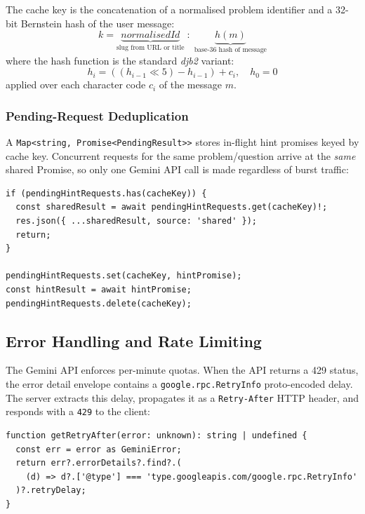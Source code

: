 \documentclass[11pt,a4paper]{article}
\begin{document}
The cache key is the concatenation of a normalised problem identifier and a
32-bit Bernstein hash of the user message:
\[
  k = \underbrace{\mathit{normalisedId}}_{\text{slug from URL or title}}
      \;:\;
      \underbrace{h(m)}_{\text{base-36 hash of message}}
\]
where the hash function is the standard \emph{djb2} variant:
\[
  h_i = ((h_{i-1} \ll 5) - h_{i-1}) + c_i, \quad h_0 = 0
\]
applied over each character code $c_i$ of the message $m$.

\subsubsection{Pending-Request Deduplication}

A \texttt{Map<string, Promise<PendingResult>>} stores in-flight hint promises
keyed by cache key.  Concurrent requests for the same problem/question arrive at
the \emph{same} shared Promise, so only one Gemini API call is made regardless of
burst traffic:

\begin{lstlisting}[style=ts, caption={Pending-request deduplication in server.ts}]
if (pendingHintRequests.has(cacheKey)) {
  const sharedResult = await pendingHintRequests.get(cacheKey)!;
  res.json({ ...sharedResult, source: 'shared' });
  return;
}

pendingHintRequests.set(cacheKey, hintPromise);
const hintResult = await hintPromise;
pendingHintRequests.delete(cacheKey);
\end{lstlisting}

\subsection{Error Handling and Rate Limiting}

The Gemini API enforces per-minute quotas.  When the API returns a 429 status,
the error detail envelope contains a \texttt{google.rpc.RetryInfo} proto-encoded
delay.  The server extracts this delay, propagates it as a \texttt{Retry-After}
HTTP header, and responds with a \texttt{429} to the client:

\begin{lstlisting}[style=ts, caption={Retry-After extraction in server.ts}]
function getRetryAfter(error: unknown): string | undefined {
  const err = error as GeminiError;
  return err?.errorDetails?.find?.(
    (d) => d?.['@type'] === 'type.googleapis.com/google.rpc.RetryInfo'
  )?.retryDelay;
}
\end{lstlisting}
\end{document}
